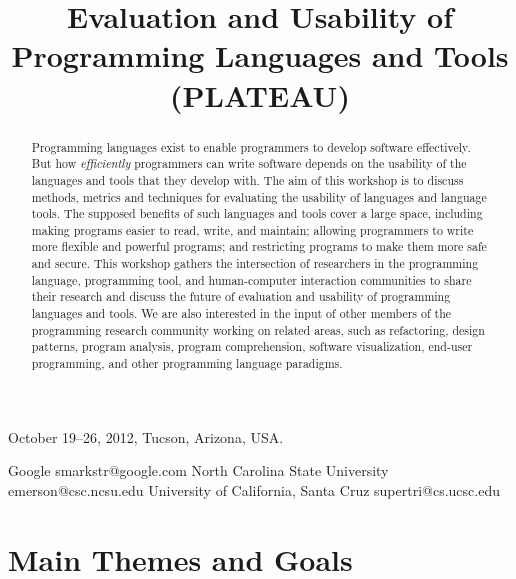 \documentclass[10pt]{sigplanconf}
\begin{document}
 {October 19--26, 2012, Tucson, Arizona, USA.}


\title{Evaluation and Usability of Programming Languages and Tools (PLATEAU)}

           {Google}
           {smarkstr@google.com}      
           {North Carolina State University}
           {emerson@csc.ncsu.edu}
           {University of California, Santa Cruz}
           {supertri@cs.ucsc.edu}
\date{}

\maketitle
\begin{abstract}

  Programming languages exist to enable programmers to develop
  software effectively.  But how \emph{efficiently} programmers can
  write software depends on the usability of the languages and tools
  that they develop with.  The aim of this workshop is to discuss
  methods, metrics and techniques for evaluating the usability of
  languages and language tools.  The supposed benefits of such
  languages and tools cover a large space, including making programs
  easier to read, write, and maintain; allowing programmers to write
  more flexible and powerful programs; and restricting programs to
  make them more safe and secure. This workshop gathers the intersection
  of researchers in the programming language, programming tool, and
  human-computer interaction communities to share their research and
  discuss the future of evaluation and usability of programming
  languages and tools. We are also interested in the input of other
  members of the programming research community working on related
  areas, such as refactoring, design patterns, program analysis,
  program comprehension, software visualization, end-user programming,
  and other programming language paradigms.

\end{abstract}





\section{Main Themes and Goals}
\end{document}
